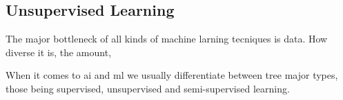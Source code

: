 \subsection{Unsupervised Learning}

The major bottleneck of all kinds of machine larning tecniques is data. How diverse it is, the amount, 

When it comes to \acrshort{ai} and \acrshort{ml} we usually differentiate between tree major types, those being supervised, unsupervised and semi-supervised learning. 

